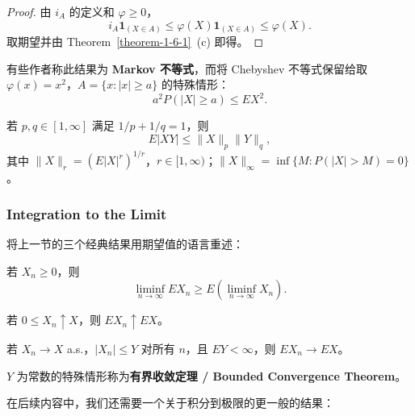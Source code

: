 \begin{proof}
    由 $i_A$ 的定义和 $\varphi \ge 0$，
    \[
        i_A \mathbf{1}_{(X \in A)} \le \varphi(X) \mathbf{1}_{(X \in A)} \le \varphi(X).
    \]
    取期望并由 Theorem~\ref{theorem-1-6-1}~(c) 即得。
\end{proof}

\begin{remark}
    有些作者称此结果为 {\normalfont\bfseries Markov 不等式}，而将 Chebyshev 不等式保留给取 $\varphi(x) = x^2$，$A = \{x : |x| \ge a\}$ 的特殊情形：
    \begin{equation}\label{eq-1-6-1}
        a^2 P(|X| \ge a) \le EX^2.
    \end{equation}
\end{remark}

\begin{theorem}\label{theorem-1-6-3}
    若 $p,q \in [1,\infty]$ 满足 $1/p + 1/q = 1$，则
    \[
        E|XY| \le \|X\|_p \|Y\|_q,
    \]
    其中 $\|X\|_r = (E|X|^r)^{1/r}$，$r \in [1,\infty)$；$\|X\|_\infty = \inf\{M : P(|X| > M) = 0\}$。
\end{theorem}

\subsubsection{Integration to the Limit}

将上一节的三个经典结果用期望值的语言重述：

\begin{theorem}\label{theorem-1-6-5}
    若 $X_n \ge 0$，则
    \[
        \liminf_{n \to \infty} EX_n \ge E\!\left(\liminf_{n \to \infty} X_n\right).
    \]
\end{theorem}

\begin{theorem}\label{theorem-1-6-6}
    若 $0 \le X_n \uparrow X$，则 $EX_n \uparrow EX$。
\end{theorem}

\begin{theorem}\label{theorem-1-6-7}
    若 $X_n \to X$ a.s.，$|X_n| \le Y$ 对所有 $n$，且 $EY < \infty$，则 $EX_n \to EX$。
\end{theorem}

$Y$ 为常数的特殊情形称为{\normalfont\bfseries 有界收敛定理 / Bounded Convergence Theorem}。

在后续内容中，我们还需要一个关于积分到极限的更一般的结果：

